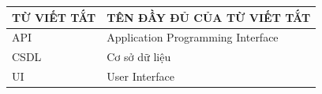 
\begin{table}[H]
\centering
\begin{tabular}{|p{5cm}|p{9cm}|}
\hline
\centering\textbf{TỪ VIẾT TẮT} & \centering\arraybackslash\textbf{TÊN ĐẦY ĐỦ CỦA TỪ VIẾT TẮT} \\
\hline
API & Application Programming Interface \\
\hline
CSDL & Cơ sở dữ liệu \\
\hline
UI & User Interface \\
\hline
\end{tabular}
\end{table}
